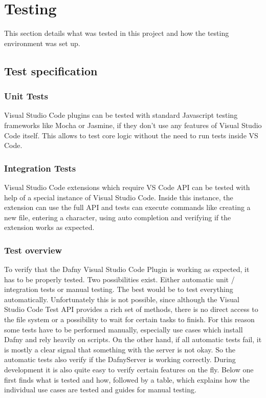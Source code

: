 \section{Testing}
This section details what was tested in this project and how the testing environment was set up.
\subsection{Test specification}
\subsubsection{Unit Tests}
Visual Studio Code plugins can be tested with standard Javascript testing frameworks like Mocha or Jasmine, if they don't use any features of Visual Studio Code itself. This allows to test core logic without the need to run tests inside VS Code.
\subsubsection{Integration Tests}
Visual Studio Code extensions which require VS Code API can be tested with help of a special instance of Visual Studio Code. Inside this instance, the extension can use the full API and tests can execute commands like creating a new file, entering a character, using auto completion and verifying if the extension works as expected.   
\subsubsection{Test overview}
To verify that the Dafny Visual Studio Code Plugin is working as expected, it has to be properly tested. Two possibilities exist. Either automatic unit / integration tests or manual testing. The best would be to test everything automatically. Unfortunately this is not possible, since although the Visual Studio Code Test API provides a rich set of methods, there is no direct access to the file system or a possibility to wait for certain tasks to finish. For this reason some tests have to be performed manually, especially use cases which install Dafny and rely heavily on scripts. On the other hand, if all automatic tests fail, it is mostly a clear signal that something with the server is not okay. So the automatic tests also verify if the DafnyServer is working correctly. During development it is also quite easy to verify certain features on the fly. 
Below one first finds what is tested and how, followed by a table, which explains how the individual use cases are tested and guides for manual testing. 
